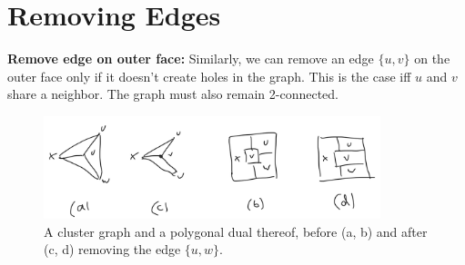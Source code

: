 \section{Removing Edges}
\label{sect:removing-edges}

\textbf{Remove edge on outer face:} Similarly, we can remove an edge $\{u, v\}$ on the outer face only if it doesn't create holes in the graph. This is the case iff $u$ and $v$ share a neighbor. The graph must also remain 2-connected.

\begin{figure}[H]
	\centering
	\includegraphics[height=30mm]{Resources/RemoveOuterEdge.png}
	\caption{A cluster graph and a polygonal dual thereof, before (a, b) and after (c, d) removing the edge $\{u,w\}$.}
	\label{fig:remove-outer-edge-example}
\end{figure}

